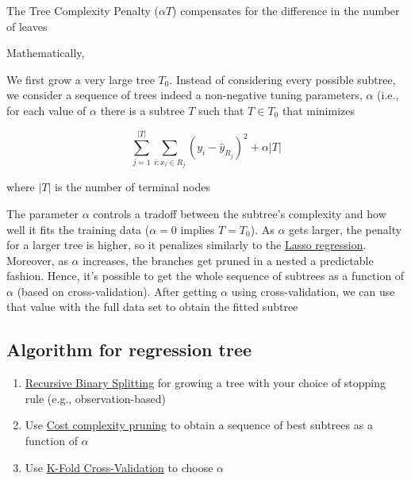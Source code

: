 \documentclass[
]{book}
\providecommand{\tightlist}{%
  \setlength{\itemsep}{0pt}\setlength{\parskip}{0pt}}
\begin{document}
The Tree Complexity Penalty (\(\alpha T\)) compensates for the difference in the number of leaves

Mathematically,

We first grow a very large tree \(T_0\). Instead of considering every possible subtree, we consider a sequence of trees indeed a non-negative tuning parameters, \(\alpha\) (i.e., for each value of \(\alpha\) there is a subtree \(T\) such that \(T \in T_0\) that minimizes

\[
\sum_{j=1}^{|T|} \sum_{i:x_i \in R_j} (y_i - \hat{y}_{R_j})^2 + \alpha |T|
\]

where \(|T|\) is the number of terminal nodes

The parameter \(\alpha\) controls a tradoff between the subtree's complexity and how well it fits the training data (\(\alpha = 0\) implies \(T = T_0\)). As \(\alpha\) gets larger, the penalty for a larger tree is higher, so it penalizes similarly to the \protect\hyperlink{lasso-regression}{Lasso regression}. Moreover, as \(\alpha\) increases, the branches get pruned in a nested a predictable fashion. Hence, it's possible to get the whole sequence of subtrees as a function of \(\alpha\) (based on cross-validation). After getting \(\alpha\) using cross-validation, we can use that value with the full data set to obtain the fitted subtree

\hypertarget{algorithm-for-regression-tree}{%
\subsection{Algorithm for regression tree}\label{algorithm-for-regression-tree}}

\begin{enumerate}
\def\labelenumi{\arabic{enumi}.}
\tightlist
\item
  \protect\hyperlink{recursive-binary-splitting}{Recursive Binary Splitting} for growing a tree with your choice of stopping rule (e.g., observation-based)
\item
  Use \protect\hyperlink{cost-complexity-pruning}{Cost complexity pruning} to obtain a sequence of best subtrees as a function of \(\alpha\)
\item
  Use \protect\hyperlink{k-fold-cross-validation}{K-Fold Cross-Validation} to choose \(\alpha\)
\end{enumerate}
\end{document}
